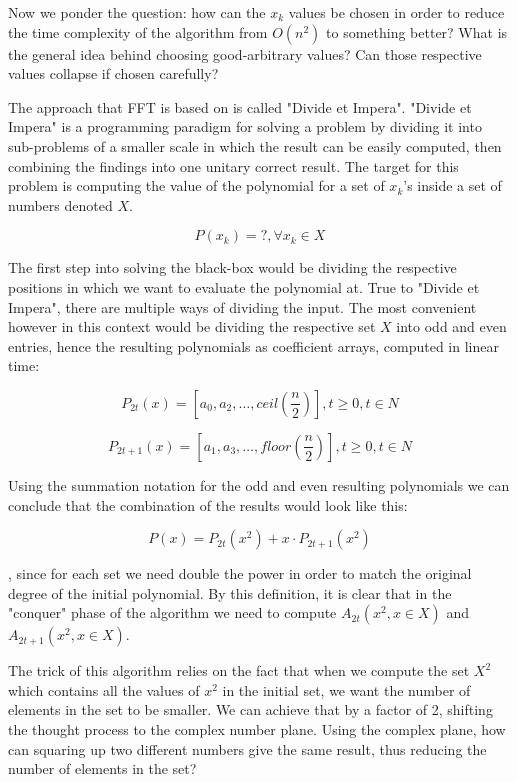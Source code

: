 \documentclass[letterpaper]{article}
\begin{document}
Now we ponder the question: how can the $x_{k}$ values be chosen in order to reduce the time complexity of the algorithm from $O(n^2)$ to something better? What is the general idea behind choosing good-arbitrary values? Can those respective values collapse if chosen carefully?

The approach that FFT is based on is called "Divide et Impera". "Divide et Impera" is a programming paradigm for solving a problem by dividing it into sub-problems of a smaller scale in which the result can be easily computed, then combining the findings into one unitary correct result. The target for this problem is computing the value of the polynomial for a set of $x_{k}$'s inside a set of numbers denoted $X$.

$$
P(x_{k}) = ?, \forall x_{k} \in X 
$$

The first step into solving the black-box would be dividing the respective positions in which we want to evaluate the polynomial at. True to "Divide et Impera", there are multiple ways of dividing the input. The most convenient however in this context would be dividing the respective set $X$ into odd and even entries, hence the resulting polynomials as coefficient arrays, computed in linear time:

$$
P_{2t}(x) = [a_{0}, a_{2}, \dots, ceil(\frac{n}{2})], t \geq 0, t \in {N}
$$

$$
P_{2t + 1}(x) = [a_{1}, a_{3}, \dots, floor(\frac{n}{2})], t \geq 0, t \in {N}
$$

Using the summation notation for the odd and even resulting polynomials we can conclude that the combination of the results would look like this:

$$
P(x) = P_{2t}(x^2) + x \cdot P_{2t + 1}(x^2)
$$

, since for each set we need double the power in order to match the original degree of the initial polynomial. By this definition, it is clear that in the "conquer" phase of the algorithm we need to compute $A_{2t}(x^2, x \in X)$ and $A_{2t + 1}(x^2, x \in X)$.

The trick of this algorithm relies on the fact that when we compute the set $X^2$ which contains all the values of $x^2$ in the initial set, we want the number of elements in the set to be smaller. We can achieve that by a factor of 2, shifting the thought process to the complex number plane. Using the complex plane, how can squaring up two different numbers give the same result, thus reducing the number of elements in the set?
\end{document}
